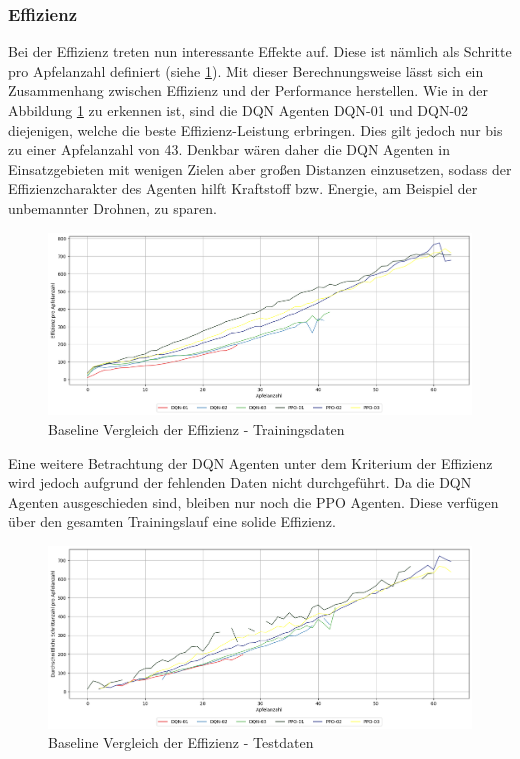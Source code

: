 \subsubsection{Effizienz} \label{sec:Evaluation_Effizienz_Baseline}
Bei der Effizienz treten nun interessante Effekte auf. Diese ist nämlich als Schritte pro Apfelanzahl definiert (siehe \ref{fig:Evaluation_Baseline_Effizienz}). Mit dieser Berechnungsweise lässt sich ein Zusammenhang zwischen Effizienz und der Performance herstellen. 
Wie in der Abbildung \ref{fig:Evaluation_Baseline_Effizienz} zu erkennen ist, sind die DQN Agenten DQN-01 und DQN-02 diejenigen, welche die beste Effizienz-Leistung erbringen. Dies gilt jedoch nur bis zu einer Apfelanzahl von 43. Denkbar wären daher die DQN Agenten in Einsatzgebieten mit wenigen Zielen aber großen Distanzen einzusetzen, sodass der Effizienzcharakter des Agenten hilft Kraftstoff bzw. Energie, am Beispiel der unbemannter Drohnen, zu sparen. 
\begin{figure}[H]
	\centering
	\includegraphics[scale=0.4517]{Abbildungen/Evaluation/baseline-effizienz.png}
	\caption[Baseline Vergleich Effizienz]{Baseline Vergleich der Effizienz - Trainingsdaten}
	\label{fig:Evaluation_Baseline_Effizienz}
\end{figure}
Eine weitere Betrachtung der DQN Agenten unter dem Kriterium der Effizienz wird jedoch aufgrund der fehlenden Daten nicht durchgeführt.
Da die DQN Agenten ausgeschieden sind, bleiben nur noch die PPO Agenten. Diese verfügen über den gesamten Trainingslauf eine solide Effizienz. 
\begin{figure}[H]
	\centering
	\includegraphics[scale=0.4517]{Abbildungen/Evaluation/baseline-effizienz2.png}
	\caption[Baseline Vergleich Effizienz]{Baseline Vergleich der Effizienz - Testdaten}
	\label{fig:Evaluation_Effizienz2_Baseline}
\end{figure}
